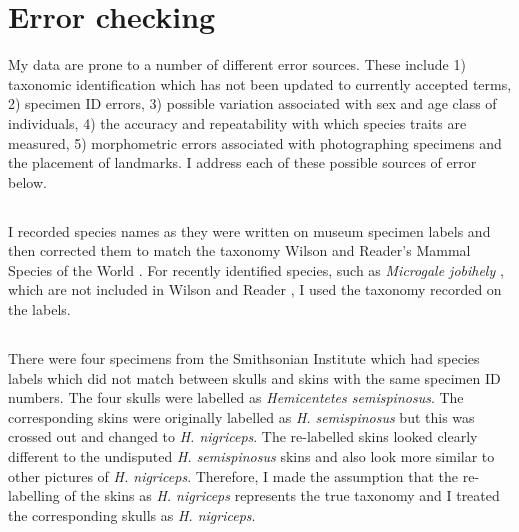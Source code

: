\subsubsection{}

\section{Error checking}
My data are prone to a number of different error sources. These include 1) taxonomic identification which has not been updated to currently accepted terms, 2) specimen ID errors, 3) possible variation associated with sex and age class of individuals, 4) the accuracy and repeatability with which species traits are measured, 5) morphometric errors associated with photographing specimens and the placement of landmarks. I address each of these possible sources of error below.  

\subsection{}
I recorded species names as they were written on museum specimen labels and then corrected them to match the taxonomy Wilson and Reader’s Mammal Species of the World \citeyearpar{Wilson2005}. For recently identified species, such as \textit{Microgale jobihely} \citep{Goodman2006}, which are not included in Wilson and Reader \citeyearpar{Wilson2005}, I used the taxonomy recorded on the labels. 

\subsection{}
	
There were four specimens from the Smithsonian Institute which had species labels which did not match between skulls and skins with the same specimen ID numbers. The four skulls were labelled as \textit{Hemicentetes semispinosus}. The corresponding skins were originally labelled as \textit{H. semispinosus} but this was crossed out and changed to \textit{H. nigriceps}. The re-labelled skins looked clearly different to the undisputed \textit{H. semispinosus} skins and also look more similar to other pictures of \textit{H. nigriceps}. Therefore, I made the assumption that the re-labelling of the skins as \textit{H. nigriceps} represents the true taxonomy and I treated the corresponding skulls as \textit{H. nigriceps}.

